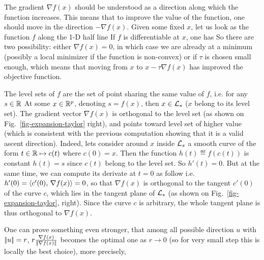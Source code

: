The gradient $\nabla f(x)$ should be understood as a direction along which the function increases. This means that to improve the value of the function, one should move in the direction $-\nabla f(x)$. Given some fixed $x$, let us look as the function $f$ along the 1-D half line 
\eq{ 
	\tau \in \RR^+ = [0,+\infty[ \longmapsto f(x-\tau \nabla f(x)) \in \RR.
}
If $f$ is differentiable at $x$, one has 
So there are two possibility: either $\nabla f(x)=0$, in which case we are already at a minimum (possibly a local minimizer if the function is non-convex) or if $\tau$ is chosen small enough, 
which means that moving from $x$ to $x-\tau \nabla f(x)$ has improved the objective function. 

\begin{rem}
	The level sets of $f$ are the set of point sharing the same value of $f$, i.e. for any $s \in \mathbb{R}$
	At some $x \in \mathbb{R}^p$, denoting $s=f(x)$, then $x \in \mathcal{L}_s$ ($x$ belong to its level set). The gradient vector $\nabla f(x)$ is orthogonal to the level set (as shown on Fig.~\ref{fig-expansion-taylor} right), and points toward level set of higher value (which is consistent with the previous computation showing that it is a valid ascent direction). 
	Indeed, lets consider around $x$ inside $\mathcal{L}_s$ a smooth curve of the form $t \in \mathbb{R} \mapsto c(t)$ where $c(0)=x$. 
	Then the function $h(t) \eqdef f(c(t))$ is constant $h(t)=s$  since $c(t)$ belong to the level set. So $h'(t)=0$. But at the same time, we can compute its derivate at $t=0$ as follow
	i.e. $h'(0) = \langle c'(0),\,\nabla f(x)\rangle=0$, so that $\nabla f(x)$ is orthogonal to the tangent $c'(0)$ of the curve $c$, which lies in the tangent plane of $\mathcal{L}_s$  (as shown on Fig.~\ref{fig-expansion-taylor}, right).  Since the curve $c$ is arbitrary, the whole tangent plane is thus orthogonal to $\nabla f(x)$. 
\end{rem}

\begin{rem}
	One can prove something even stronger, that among all possible direction $u$ with $|\!| u |\!|=r$, $r \frac{\nabla f(x)}{|\!| \nabla f(x) |\!|}$ becomes the optimal one as $r \rightarrow 0$ (so for very small step this is locally the best choice), more precisely, 
\end{rem}


